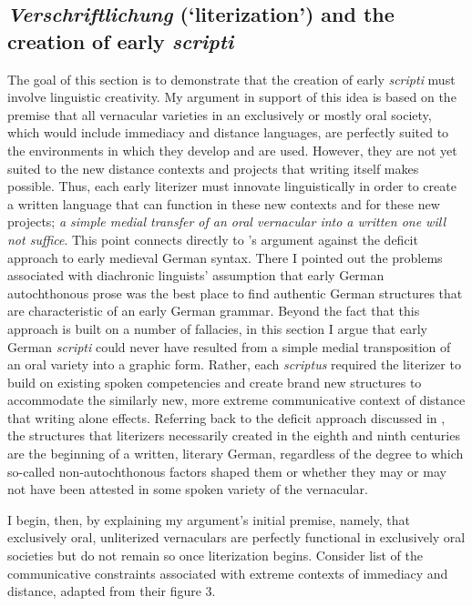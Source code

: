 \subsection{\textit{Verschriftlichung} (`literization') and the creation of early \textit{scripti}}\label{sec:3:3.2.2}

The goal of this section is to demonstrate that the creation of early \textit{scripti} must involve linguistic creativity. My argument in support of this idea is based on the premise that all vernacular varieties in an exclusively or mostly oral society, which would include immediacy and distance languages, are perfectly suited to the environments in which they develop and are used. However, they are not yet suited to the new distance contexts and projects that writing itself makes possible. Thus, each early literizer must innovate linguistically in order to create a written language that can function in these new contexts and for these new projects; \textit{a simple medial transfer of an oral vernacular into a written one will not suffice}. This point connects directly to ’s argument against the deficit approach to early medieval German syntax. There I pointed out the problems associated with diachronic linguists’ assumption that early German autochthonous prose was the best place to find authentic German structures that are characteristic of an early German grammar. Beyond the fact that this approach is built on a number of fallacies, in this section I argue that early German \textit{scripti} could never have resulted from a simple medial transposition of an oral variety into a graphic form. Rather, each \textit{scriptus} required the literizer to build on existing spoken competencies and create brand new structures to accommodate the similarly new, more extreme communicative context of distance that writing alone effects. Referring back to the deficit approach discussed in , the structures that literizers necessarily created in the eighth and ninth centuries are the beginning of a written, literary German, regardless of the degree to which so-called non-autochthonous factors shaped them or whether they may or may not have been attested in some spoken variety of the vernacular.

  I begin, then, by explaining my argument’s initial premise, namely, that exclusively oral, unliterized vernaculars are perfectly functional in exclusively oral societies but do not remain so once literization begins. Consider  list of the communicative constraints associated with extreme contexts of immediacy and distance, adapted from their figure 3.

